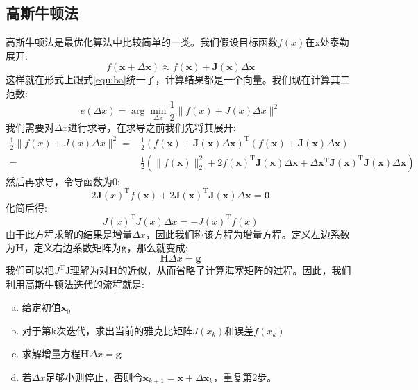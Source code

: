 \subsection{高斯牛顿法}
高斯牛顿法是最优化算法中比较简单的一类。我们假设目标函数$f(x)$在x处泰勒展开:
\begin{equation}
f(\boldsymbol{x}+\Delta \boldsymbol{x}) \approx f(\boldsymbol{x})+\boldsymbol{J}(\boldsymbol{x}) \Delta \boldsymbol{x}
\end{equation}
这样就在形式上跟式\ref{equ:ba}统一了，计算结果都是一个向量。我们现在计算其二范数:
\begin{equation}
e(\Delta x)=\arg \min _{\Delta x} \frac{1}{2}\|f(x)+J(x) \Delta x\|^{2}
\end{equation}
我们需要对$\Delta x$进行求导，在求导之前我们先将其展开:
\begin{equation}
\begin{aligned}
\frac{1}{2}\|f(x)+J(x) \Delta x\|^{2}=&\frac{1}{2}(f(\boldsymbol{x})+\boldsymbol{J}(\boldsymbol{x}) \Delta \boldsymbol{x})^{\mathrm{T}}(f(\boldsymbol{x})+\boldsymbol{J}(\boldsymbol{x}) \Delta \boldsymbol{x})\\
=&\frac{1}{2}\left(\|f(\boldsymbol{x})\|_{2}^{2}+2 f(\boldsymbol{x})^{\mathrm{T}} \boldsymbol{J}(\boldsymbol{x}) \Delta \boldsymbol{x}+\Delta \boldsymbol{x}^{\mathrm{T}} \boldsymbol{J}(\boldsymbol{x})^{\mathrm{T}} \boldsymbol{J}(\boldsymbol{x}) \Delta \boldsymbol{x}\right)
\end{aligned}
\end{equation}
然后再求导，令导函数为0:
\begin{equation}
2 \boldsymbol{J}(x)^{\mathrm{T}} f(\boldsymbol{x})+2 \boldsymbol{J}(\boldsymbol{x})^{\mathrm{T}} \boldsymbol{J}(\boldsymbol{x}) \Delta \boldsymbol{x}=\mathbf{0}
\end{equation}
化简后得:
\begin{equation}
J(x)^{\mathrm{T}} J(x) \Delta x=-J(x)^{\mathrm{T}} f(x)
\end{equation}
由于此方程求解的结果是增量$\Delta x$，因此我们称该方程为增量方程。定义左边系数为$\boldsymbol{H}$，定义右边系数矩阵为$\boldsymbol{g}$，那么就变成:
\begin{equation}
\boldsymbol{H} \Delta x=\boldsymbol{g}
\end{equation}
我们可以把$J^{\mathrm{T}} \mathrm{J}$理解为对$\boldsymbol{H}$的近似，从而省略了计算海塞矩阵的过程。因此，我们利用高斯牛顿法迭代的流程就是:
\begin{enumerate}[(a)]
	\item 给定初值$\boldsymbol{x}_0$
	\item 对于第k次迭代，求出当前的雅克比矩阵$J(x_k)$和误差$f(x_k)$
	\item 求解增量方程$\boldsymbol{H} \Delta x=\boldsymbol{g}$
	\item 若$\Delta x$足够小则停止，否则令$\boldsymbol{x}_{k+1}=\boldsymbol{x}+\Delta \boldsymbol{x}_k$，重复第2步。
\end{enumerate}\par
